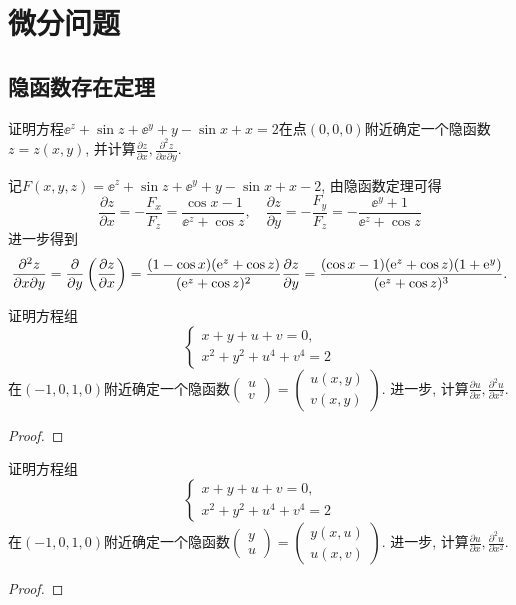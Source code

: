 \chapter{微分问题}
\section{隐函数存在定理}
\begin{quiza}
\woe 证明方程\(\ee^z+\sin z+\ee^y+y-\sin x+x=2\)在点\((0,0,0)\)附近确定一个隐函数\(z=z(x,y)\), 并计算\(\frac{\partial z}{\partial x},\frac{\partial^2 z}{\partial x\partial y}\).
\begin{solution}
记\(F(x,y,z)=\ee^z+\sin z+\ee^y+y-\sin x+x-2\), 由隐函数定理可得\[\frac{\partial z}{\partial x}=-\frac{F_x}{F_z}=\frac{\cos x-1}{\ee^z+\cos z},\quad\frac{\partial z}{\partial y}=-\frac{F_y}{F_z}=-\frac{\ee^y+1}{\ee^z+\cos z}\]进一步得到\[\frac{\partial^2z}{\partial x\partial y}=\frac{\partial}{\partial y}\left(\frac{\partial z}{\partial x}\right)=\frac{(1-\cos x)(\mathrm{e}^z+\cos z)}{(\mathrm{e}^z+\cos z)^2}\frac{\partial z}{\partial y}=\frac{(\cos x-1)(\mathrm{e}^z+\cos z)(1+\mathrm{e}^y)}{(\mathrm{e}^z+\cos z)^3}.\qedhere\]
\end{solution}
\woe 证明方程组\[\begin{cases}
    x+y+u+v=0,\\ x^2+y^2+u^4+v^4=2
\end{cases}\]在\((-1,0,1,0)\)附近确定一个隐函数\(\left(\begin{matrix}
u\\ v
\end{matrix}\right)=\left(\begin{matrix}
u(x,y)\\v(x,y)
\end{matrix}\right)\). 进一步, 计算\(\frac{\partial u}{\partial x},\frac{\partial^2u}{\partial x^2}.\)
\begin{proof}

\end{proof}
\woe 证明方程组\[\begin{cases}
    x+y+u+v=0,\\x^2+y^2+u^4+v^4=2
\end{cases}\]在\((-1,0,1,0)\)附近确定一个隐函数\(\left(\begin{matrix}
y\\ u
\end{matrix}\right)=\left(\begin{matrix}
y(x,u)\\u(x,v)
\end{matrix}\right)\). 进一步, 计算\(\frac{\partial u}{\partial x},\frac{\partial^2u}{\partial x^2}.\)
\begin{proof}

\end{proof}
\end{quiza}
